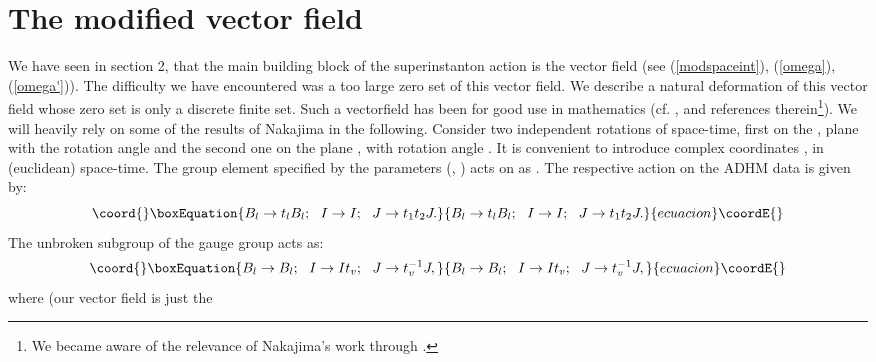 \documentclass[a4paper,12pt]{article}
\begin{document}
\setcounter{equation}{0}
\section{The modified vector field }
\renewcommand{\theequation}{3.\arabic{equation}}
We have seen in section 2, that the main building block of the
superinstanton action is the vector field \coordHE{} (see
(\ref{modspaceint}), (\ref{omega}), (\ref{omega'})). The
difficulty we have encountered was a too large zero set of this
vector field. We describe a natural deformation of this vector
field whose zero set is only a discrete finite set. Such a
vectorfield has been for good use in mathematics (cf. \cite{Nak},
and references therein\footnote{We became aware of the relevance
of Nakajima's work through \cite{N}.}). We will heavily rely on
some of the results of Nakajima in the following. Consider two
independent rotations of space-time, first  on the \coordHE{}, \coordHE{}
plane with the rotation angle \coordHE{} and the second one on
the plane \coordHE{}, \coordHE{} with rotation angle \coordHE{}. It is
convenient to introduce complex coordinates \coordHE{},
\coordHE{} in (euclidean) space-time. The group element
specified by the parameters \coordHE{} (\coordHE{}, \coordHE{}) acts on \coordHE{} as
\coordHE{}. The respective action
on the ADHM data is given by:
\begin{equation}\coord{}\boxEquation{
B_l\rightarrow t_l B_l ; \, \, \, \, I\rightarrow I; \, \, \, \, J\rightarrow t_1 t_2 J.
\label{torusaction}
}{
B_l\rightarrow t_l B_l ; \, \, \, \, I\rightarrow I; \, \, \, \, J\rightarrow t_1 t_2 J.
}{ecuacion}\coordE{}\end{equation}
The unbroken \coordHE{} subgroup of the gauge group acts as:
\begin{equation}\coord{}\boxEquation{
B_l\rightarrow B_l ; \, \, \, \, I\rightarrow It_v; \, \, \, \, J\rightarrow t_v^{-1} J,
\label{u1action}
}{
B_l\rightarrow B_l ; \, \, \, \, I\rightarrow It_v; \, \, \, \, J\rightarrow t_v^{-1} J,
}{ecuacion}\coordE{}\end{equation}
where \coordHE{} (our vector field \coordHE{} is just the
\end{document}
